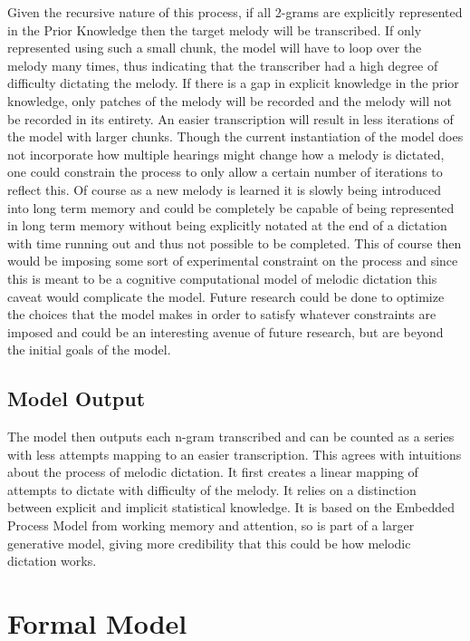 \documentclass[]{book}
\begin{document}
Given the recursive nature of this process, if all 2-grams are explicitly represented in the Prior Knowledge then the target melody will be transcribed.
If only represented using such a small chunk, the model will have to loop over the melody many times, thus indicating that the transcriber had a high degree of difficulty dictating the melody.
If there is a gap in explicit knowledge in the prior knowledge, only patches of the melody will be recorded and the melody will not be recorded in its entirety.
An easier transcription will result in less iterations of the model with larger chunks.
Though the current instantiation of the model does not incorporate how multiple hearings might change how a melody is dictated, one could constrain the process to only allow a certain number of iterations to reflect this.
Of course as a new melody is learned it is slowly being introduced into long term memory and could be completely be capable of being represented in long term memory without being explicitly notated at the end of a dictation with time running out and thus not possible to be completed.
This of course then would be imposing some sort of experimental constraint on the process and since this is meant to be a cognitive computational model of melodic dictation this caveat would complicate the model.
Future research could be done to optimize the choices that the model makes in order to satisfy whatever constraints are imposed and could be an interesting avenue of future research, but are beyond the initial goals of the model.

\hypertarget{model-output}{%
\subsection{Model Output}\label{model-output}}

The model then outputs each n-gram transcribed and can be counted as a series with less attempts mapping to an easier transcription.
This agrees with intuitions about the process of melodic dictation.
It first creates a linear mapping of attempts to dictate with difficulty of the melody.
It relies on a distinction between explicit and implicit statistical knowledge.
It is based on the Embedded Process Model from working memory and attention, so is part of a larger generative model, giving more credibility that this could be how melodic dictation works.

\hypertarget{formal-model}{%
\section{Formal Model}\label{formal-model}}
\end{document}
